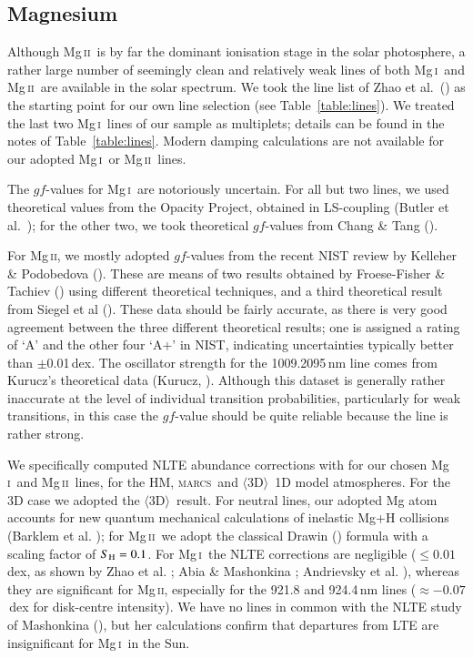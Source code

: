 \documentclass[traditabstract]{aa}
\newcommand{\oneDAV}{$\langle\mathrm{3D}\rangle$}
\newcommand{\marcs}{\textsc{marcs}}
\newcommand{\altmgi}{Mg\,\textsc{i}}
\newcommand{\altmgii}{Mg\,\textsc{ii}}
\newcommand{\mgi}{\altmgi\ }
\newcommand{\mgii}{\altmgii\ }
\begin{document}
\subsection{Magnesium}
Although \mgii is by far the dominant ionisation stage in the solar photosphere, a rather large number of seemingly clean and relatively weak lines of both \mgi and \mgii are available in the solar spectrum.  We took the line list of Zhao et al.\ (\cite{zhao1}) as the starting point for our own line selection (see Table~\ref{table:lines}). We treated the last two \mgi lines of our sample as multiplets; details can be found in the notes of Table~\ref{table:lines}.  Modern damping calculations are not available for our adopted \mgi or \altmgii\ lines.

The $gf$-values for \mgi are notoriously uncertain.  For all but two lines, we used theoretical values from the Opacity Project, obtained in LS-coupling (Butler et al.\ \cite{butl}); for the other two, we took theoretical $gf$-values from Chang \& Tang (\cite{Chang90}).

For \altmgii, we mostly adopted $gf$-values from the recent NIST review by Kelleher \& Podobedova (\cite{kel1}).  These are means of two results obtained by Froese-Fisher \& Tachiev (\cite{FF}) using different theoretical techniques, and a third theoretical result from Siegel et al (\cite{Siegel98}).  These data should be fairly accurate, as there is very good agreement between the three different theoretical results; one is assigned a rating of `A' and the other four `A+' in NIST, indicating uncertainties typically better than $\pm$0.01\,dex. The oscillator strength for the 1009.2095\,nm line comes from Kurucz's theoretical data (Kurucz, \cite{kur}). Although this dataset is generally rather inaccurate at the level of individual transition probabilities, particularly for weak transitions, in this case the $gf$-value should be quite reliable because the line is rather strong.

We specifically computed NLTE abundance corrections with for our chosen \mgi and \mgii lines, for the HM, \marcs\ and \oneDAV\ 1D model atmospheres.  For the 3D case we adopted the \oneDAV\ result. For neutral lines, our adopted Mg atom accounts for new quantum mechanical calculations of inelastic Mg+H collisions (Barklem et al. \cite{barklem_mg}); for \mgii we adopt the classical Drawin (\cite{dra}) formula with a scaling factor of $S_{\rm H}=0.1$.  For \mgi the NLTE corrections are negligible ($\le$$0.01$\,dex, as shown by Zhao et al. \cite{zhao1}; Abia \& Mashonkina \cite{abia}; Andrievsky et al. \cite{andrievsky_mg}), whereas they are significant for \altmgii, especially for the 921.8 and 924.4\,nm lines ($\approx$$-0.07$\,dex for disk-centre intensity).  We have no lines in common with the NLTE study of Mashonkina (\cite{mashonkina_mg}), but her calculations confirm that departures from LTE are insignificant for \mgi in the Sun.
\end{document}

